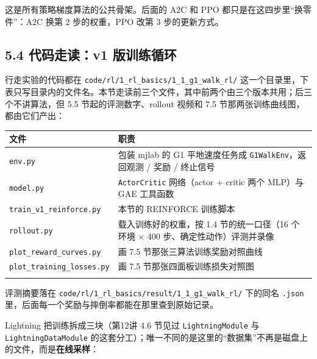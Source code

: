 \documentclass[
  chinese,
]{ctexart}
\begin{document}
这是所有策略梯度算法的公共骨架。后面的 A2C 和 PPO
都只是在这四步里``换零件''：A2C 换第 2 步的权重，PPO 改第 3
步的更新方式。

\subsection{5.4 代码走读：v1
版训练循环}\label{ux4ee3ux7801ux8d70ux8bfbv1-ux7248ux8badux7ec3ux5faaux73af}

行走实验的代码都在 \texttt{code/rl/1\_rl\_basics/1\_1\_g1\_walk\_rl/}
这一个目录里，下表只写目录内的文件名。本节走读前三个文件，其中前两个由三个版本共用；后三个不讲算法，但
5.5 节起的评测数字、rollout 视频和 7.5
节那两张训练曲线图，都由它们产出：

\begin{center}
\begin{tabular}{@{}>{\raggedright\arraybackslash}p{} >{\raggedright\arraybackslash}p{}@{}}
\toprule\noalign{}
文件 & 职责 \\
\midrule\noalign{}
\texttt{env.py} & 包装 mjlab 的 G1 平地速度任务成 \texttt{G1WalkEnv}，返回观测 / 奖励 / 终止信号 \\
\texttt{model.py} & \texttt{ActorCritic} 网络（actor + critic 两个 MLP）与 GAE 工具函数 \\
\texttt{train\_\allowbreak v1\_\allowbreak reinforce.py} & 本节的 REINFORCE 训练脚本 \\
\texttt{rollout.py} & 载入训练好的权重，按 1.4 节的统一口径（16 个环境 × 400 步、确定性动作）评测并录像 \\
\texttt{plot\_\allowbreak reward\_\allowbreak curves.py} & 画 7.5 节那张三算法训练奖励对照曲线 \\
\texttt{plot\_\allowbreak training\_\allowbreak losses.py} & 画 7.5 节那张四面板训练损失对照图 \\
\bottomrule\noalign{}
\end{tabular}
\end{center}

评测摘要落在 \texttt{code/rl/1\_rl\_basics/result/1\_1\_g1\_walk\_rl/}
下的同名 \texttt{.json}
里，后面每一个奖励与摔倒率都能在那里查到原始记录。

Lightning 把训练拆成三块（第12讲 4.6 节见过 \texttt{LightningModule} 与
\texttt{LightningDataModule}
的这套分工）；唯一不同的是这里的``数据集''不再是磁盘上的文件，而是\textbf{在线采样}：
\end{document}
